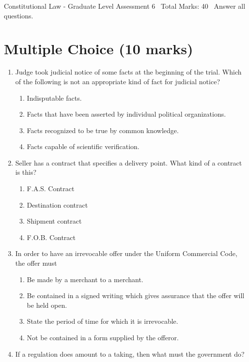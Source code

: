 \documentclass[12pt]{article}
\begin{document}
\begin{center}
Constitutional Law - Graduate Level Assessment 6 \
Total Marks: 40 \
Answer all questions.
\end{center}

\section*{Multiple Choice (10 marks)}
\begin{enumerate}[label=\arabic*.]
\item Judge took judicial notice of some facts at the beginning of the trial. Which of the following is not an appropriate kind of fact for judicial notice?
\begin{enumerate}[label=(\alph*)]
    \item Indisputable facts.
    \item Facts that have been asserted by individual political organizations.
    \item Facts recognized to be true by common knowledge.
    \item Facts capable of scientific verification.
\end{enumerate}
\item Seller has a contract that specifies a delivery point. What kind of a contract is this?
\begin{enumerate}[label=(\alph*)]
    \item F.A.S. Contract
    \item Destination contract
    \item Shipment contract
    \item F.O.B. Contract
\end{enumerate}
\item In order to have an irrevocable offer under the Uniform Commercial Code, the offer must
\begin{enumerate}[label=(\alph*)]
    \item Be made by a merchant to a merchant.
    \item Be contained in a signed writing which gives assurance that the offer will be held open.
    \item State the period of time for which it is irrevocable.
    \item Not be contained in a form supplied by the offeror.
\end{enumerate}
\item If a regulation does amount to a taking, then what must the government do?
\begin{enumerate}[label=(\alph*)]

\end{enumerate}
\end{enumerate}
\end{document}
